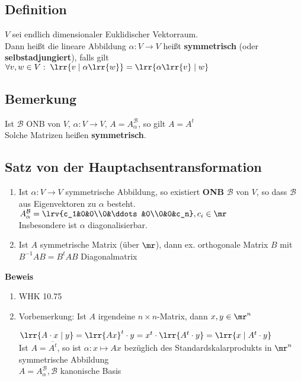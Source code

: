 {\subsection{Definition}
	$V$ sei endlich dimensionaler Euklidischer Vektorraum.\\
	Dann heißt die lineare Abbildung $\alpha:V\rightarrow V$ heißt \textbf{symmetrisch} (oder \textbf{selbstadjungiert}), falls gilt $\forall v,w\in V:\;\lrr{v\mid\alpha\lrr{w}}=\lrr{\alpha\lrr{v}\mid w}$

\subsection{Bemerkung}
	Ist $\mathcal{B}$ ONB von $V$, $\alpha:V\rightarrow V$, $A=A_\alpha^{\mathcal{B}}$, so gilt $A=A^t$\\
	Solche Matrizen heißen \textbf{symmetrisch}.

\subsection{Satz von der Hauptachsentransformation}
	\begin{enumerate}
		\item Ist $\alpha: V\rightarrow V$ symmetrische Abbildung, so existiert \textbf{ONB} $\mathcal{B}$ von $V$, so dass $\mathcal{B}$ aus Eigenvektoren zu $\alpha$ besteht.\\
			$A_\alpha^{\mathcal{B}}=\lrv{c_1&0&0\\0&\ddots&0\\0&0&c_n}, c_i\in\mr$\\
			Insbesondere ist $\alpha$ diagonalisierbar.
		\item Ist $A$ symmetrische Matrix (über $\mr$), dann ex. orthogonale Matrix $B$ mit $B^{-1} A B =B^tAB$ Diagonalmatrix
	\end{enumerate}
	\textbf{Beweis}
	\begin{enumerate}
		\item WHK 10.75
		\item Vorbemerkung: Ist $A$ irgendeine $n\times n$-Matrix, dann $x,y\in\mr^n$
			
			$\lrr{A\cdot x\mid y} = \lrr{Ax}^t\cdot y = x^t\cdot\lrr{A^t\cdot y}=\lrr{x\mid A^t\cdot y}$\\
			Ist $A=\overline{A^t}$, so ist $\alpha: x\mapsto Ax$ bezüglich des Standardskalarprodukts in $\mr^n$ symmetrische Abbildung\\
			$A=A_\alpha^{\mathcal{B}}, \mathcal{B}$ kanonische Basis


\end{enumerate}}
